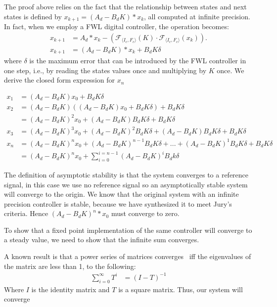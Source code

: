 \documentclass[runningheads,a4paper]{llncs}
\begin{document}
The proof above relies on the fact that the relationship between states and next states is defined by
$x_{k+1} = (A_d  - B_dK)*x_k$, all computed at infinite precision. In fact, when we employ a FWL digital controller, 
the operation becomes:
\begin{align*}
x_{k+1} &= A_d * x_{k} -(\mathcal{F}_{\langle I_c,F_c \rangle}(K)\cdot\mathcal{F}_{\langle I_c,F_c \rangle}(x_{k})).  \\
x_{k+1} &= (A_d  - B_dK)*x_k + B_dK\delta
\end{align*}
where $\delta$ is the maximum error that can be introduced by the FWL controller in one step, i.e., by reading the states values once and multiplying by $K$ once. We derive the closed form expression for $x_n$

\begin{align*}
x_{1} &= (A_d  - B_dK)x_0 + B_dK\delta \\
x_{2} &= (A_d  - B_dK)((A_d  - B_dK)x_0 + B_dK\delta ) + B_dK\delta \\
      &=(A_d  - B_dK)^2x_0 + (A_d  - B_dK)B_dK\delta + B_dK\delta \\
x_{3}  &=(A_d  - B_dK)^3x_0 + (A_d  - B_dK)^2B_dK\delta + (A_d  - B_dK)B_dK\delta + B_dK\delta\\
x_{n} &= (A_d  - B_dK)^nx_0 + (A_d  - B_dK)^{n-1}B_dK\delta + ... + (A_d  - B_dK)^1B_dK \delta + B_dK\delta \\
  &= (A_d - B_dK)^nx_0 + \sum_{i=0}^{i=n-1}(A_d - B_dK)^iB_dk\delta
\end{align*}

The definition of asymptotic stability is that the system converges to a reference signal, in this case we use no
reference signal so an asymptotically stable system will converge to the origin. We know that the original system
with an infinite precision controller is stable, because we have synthesized it to meet Jury's criteria. Hence
$(A_d  - B_dK)^n*x_0$ must converge to zero. 

To show that a fixed point implementation of the same controller will converge to a steady value, we need to show that the infinite sum converges.

A known result is that a power series of matrices converges~\cite{horn1990matrix} iff the eigenvalues of the matrix are less than 1, to the following:
\begin{align*}
\sum_{i=0}^{\infty}T^i  &= (I - T)^{-1}
\end{align*}
Where $I$ is the identity matrix and $T$ is a square matrix. Thus, our system will converge
\end{document}
